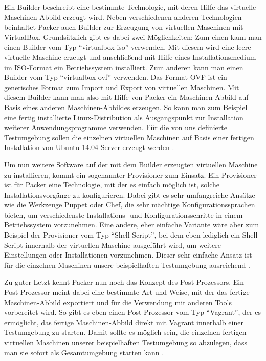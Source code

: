 Ein Builder beschreibt eine bestimmte Technologie, mit deren Hilfe das virtuelle Maschinen-Abbild erzeugt wird. Neben verschiedenen anderen Technologien beinhaltet Packer auch Builder zur Erzeugung von virtuellen Maschinen mit VirtualBox. Grundsätzlich gibt es dabei zwei Möglichkeiten: Zum einen kann man einen Builder vom Typ "`virtualbox-iso"' verwenden. Mit diesem wird eine leere virtuelle Maschine erzeugt und anschließend mit Hilfe eines Installationsmedium im ISO-Format ein Betriebssystem installiert. Zum anderen kann man einen Builder vom Typ "`virtualbox-ovf"' verwenden. Das Format OVF ist ein generisches Format zum Import und Export von virtuellen Maschinen. Mit diesem Builder kann man also mit Hilfe von Packer ein Maschinen-Abbild auf Basis eines anderen Maschinen-Abbildes erzeugen. So kann man zum Beispiel eine fertig installierte Linux-Distribution als Ausgangspunkt zur Installation weiterer Anwendungsprogramme verwenden. Für die von uns definierte Testumgebung sollen die einzelnen virtuellen Maschinen auf Basis einer fertigen Installation von Ubuntu 14.04 Server erzeugt werden \citep[Vgl.][]{Packer:001}.

Um nun weitere Software auf der mit dem Builder erzeugten virtuellen Maschine zu installieren, kommt ein sogenannter Provisioner zum Einsatz. Ein Provisioner ist für Packer eine Technologie, mit der es einfach möglich ist, solche Installationsvorgänge zu konfigurieren. Dabei gibt es sehr umfangreiche Ansätze wie die Werkzeuge Puppet oder Chef, die sehr mächtige Konfigurationssprachen bieten, um verschiedenste Installations- und Konfigurationsschritte in einem Betriebssystem vorzunehmen. Eine andere, eher einfache Variante wäre aber zum Beispiel der Provisioner vom Typ "`Shell Script"', bei dem eben lediglich ein Shell Script innerhalb der virtuellen Maschine ausgeführt wird, um weitere Einstellungen oder Installationen vorzunehmen. Dieser sehr einfache Ansatz ist für die einzelnen Maschinen unsere beispielhaften Testumgebung ausreichend \citep[Vgl.][]{Packer:002}.

Zu guter Letzt kennt Packer nun noch das Konzept des Post-Prozessors. Ein Post-Prozessor meint dabei eine bestimmte Art und Weise, mit der das fertige Maschinen-Abbild exportiert und für die Verwendung mit anderen Tools vorbereitet wird. So gibt es eben einen Post-Prozessor vom Typ "`Vagrant"', der es ermöglicht, das fertige Maschinen-Abbild direkt mit Vagrant innerhalb einer Testumgebung zu starten. Damit sollte es möglich sein, die einzelnen fertigen virtuellen Maschinen unserer beispielhaften Testumgebung so abzulegen, dass man sie sofort als Gesamtumgebung starten kann \citep[Vgl.][]{Packer:003}.

